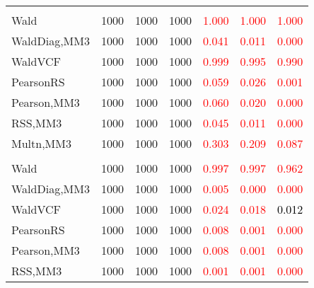 \documentclass[
]{article}
\begin{document}
\begin{table}[H]
{\begin{tabular}[t]{lrrrrrr}
\addlinespace[0.3em]
\multicolumn{7}{l}{\textbf{1F 8V}}\\
\hspace{1em}Wald & 1000 & 1000 & 1000 & \textcolor{red}{1.000} & \textcolor{red}{1.000} & \textcolor{red}{1.000}\\
\hspace{1em}WaldDiag,MM3 & 1000 & 1000 & 1000 & \textcolor{red}{0.041} & \textcolor{red}{0.011} & \textcolor{red}{0.000}\\
\hspace{1em}WaldVCF & 1000 & 1000 & 1000 & \textcolor{red}{0.999} & \textcolor{red}{0.995} & \textcolor{red}{0.990}\\
\hspace{1em}PearsonRS & 1000 & 1000 & 1000 & \textcolor{red}{0.059} & \textcolor{red}{0.026} & \textcolor{red}{0.001}\\
\hspace{1em}Pearson,MM3 & 1000 & 1000 & 1000 & \textcolor{red}{0.060} & \textcolor{red}{0.020} & \textcolor{red}{0.000}\\
\hspace{1em}RSS,MM3 & 1000 & 1000 & 1000 & \textcolor{red}{0.045} & \textcolor{red}{0.011} & \textcolor{red}{0.000}\\
\hspace{1em}Multn,MM3 & 1000 & 1000 & 1000 & \textcolor{red}{0.303} & \textcolor{red}{0.209} & \textcolor{red}{0.087}\\
\addlinespace[0.3em]
\multicolumn{7}{l}{\textbf{1F 15V}}\\
\hspace{1em}Wald & 1000 & 1000 & 1000 & \textcolor{red}{0.997} & \textcolor{red}{0.997} & \textcolor{red}{0.962}\\
\hspace{1em}WaldDiag,MM3 & 1000 & 1000 & 1000 & \textcolor{red}{0.005} & \textcolor{red}{0.000} & \textcolor{red}{0.000}\\
\hspace{1em}WaldVCF & 1000 & 1000 & 1000 & \textcolor{red}{0.024} & \textcolor{red}{0.018} & \textcolor{black}{0.012}\\
\hspace{1em}PearsonRS & 1000 & 1000 & 1000 & \textcolor{red}{0.008} & \textcolor{red}{0.001} & \textcolor{red}{0.000}\\
\hspace{1em}Pearson,MM3 & 1000 & 1000 & 1000 & \textcolor{red}{0.008} & \textcolor{red}{0.001} & \textcolor{red}{0.000}\\
\hspace{1em}RSS,MM3 & 1000 & 1000 & 1000 & \textcolor{red}{0.001} & \textcolor{red}{0.001} & \textcolor{red}{0.000}\\

\end{tabular}}
\end{table}
\end{document}
